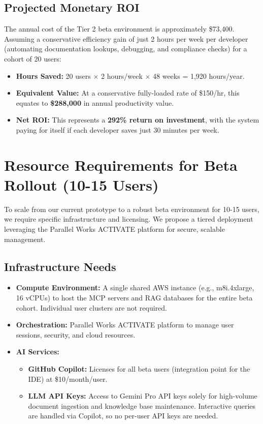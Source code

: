 \documentclass[10pt]{article}
\begin{document}
\subsection*{Projected Monetary ROI}
The annual cost of the Tier 2 beta environment is approximately \$73,400. Assuming a conservative efficiency gain of just 2 hours per week per developer (automating documentation lookups, debugging, and compliance checks) for a cohort of 20 users:
\begin{itemize}
    \item \textbf{Hours Saved:} 20 users $\times$ 2 hours/week $\times$ 48 weeks = 1,920 hours/year.
    \item \textbf{Equivalent Value:} At a conservative fully-loaded rate of \$150/hr, this equates to \textbf{\$288,000} in annual productivity value.
    \item \textbf{Net ROI:} This represents a \textbf{292\% return on investment}, with the system paying for itself if each developer saves just 30 minutes per week.
\end{itemize}

\section*{Resource Requirements for Beta Rollout (10-15 Users)}
To scale from our current prototype to a robust beta environment for 10-15 users, we require specific infrastructure and licensing. We propose a tiered deployment leveraging the Parallel Works ACTIVATE platform for secure, scalable management.

\subsection*{Infrastructure Needs}
\begin{itemize}
    \item \textbf{Compute Environment:} A single shared AWS instance (e.g., m8i.4xlarge, 16 vCPUs) to host the MCP servers and RAG databases for the entire beta cohort. Individual user clusters are not required.
    \item \textbf{Orchestration:} Parallel Works ACTIVATE platform to manage user sessions, security, and cloud resources.
    \item \textbf{AI Services:}
    \begin{itemize}
        \item \textbf{GitHub Copilot:} Licenses for all beta users (integration point for the IDE) at \$10/month/user.
        \item \textbf{LLM API Keys:} Access to Gemini Pro API keys solely for high-volume document ingestion and knowledge base maintenance. Interactive queries are handled via Copilot, so no per-user API keys are needed.
    \end{itemize}
\end{itemize}
\end{document}
